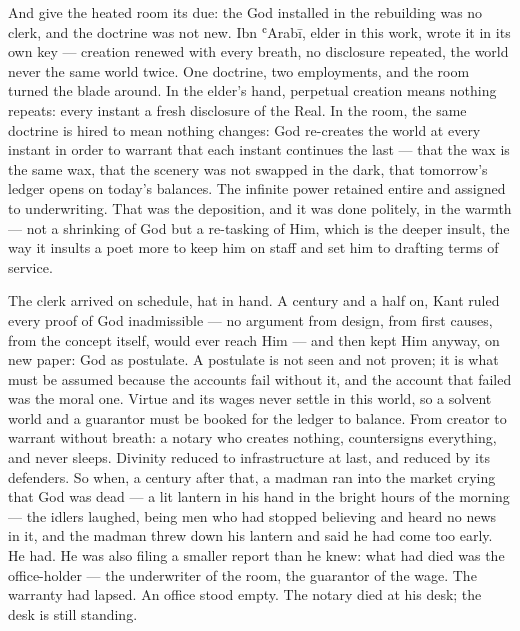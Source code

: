 And give the heated room its due: the God installed in the rebuilding
was no clerk, and the doctrine was not new. Ibn ʿArabī, elder in this
work, wrote it in its own key --- creation renewed with every breath, no
disclosure repeated, the world never the same world twice. One doctrine,
two employments, and the room turned the blade around. In the elder's
hand, perpetual creation means nothing repeats: every instant a fresh
disclosure of the Real. In the room, the same doctrine is hired to mean
nothing changes: God re-creates the world at every instant in order to
warrant that each instant continues the last --- that the wax is the
same wax, that the scenery was not swapped in the dark, that tomorrow's
ledger opens on today's balances. The infinite power retained entire and
assigned to underwriting. That was the deposition, and it was done
politely, in the warmth --- not a shrinking of God but a re-tasking of
Him, which is the deeper insult, the way it insults a poet more to keep
him on staff and set him to drafting terms of service.

The clerk arrived on schedule, hat in hand. A century and a half on,
Kant ruled every proof of God inadmissible --- no argument from design,
from first causes, from the concept itself, would ever reach Him --- and
then kept Him anyway, on new paper: God as postulate. A postulate is not
seen and not proven; it is what must be assumed because the accounts
fail without it, and the account that failed was the moral one. Virtue
and its wages never settle in this world, so a solvent world and a
guarantor must be booked for the ledger to balance. From creator to
warrant without breath: a notary who creates nothing, countersigns
everything, and never sleeps. Divinity reduced to infrastructure at
last, and reduced by its defenders. So when, a century after that, a
madman ran into the market crying that God was dead --- a lit lantern in
his hand in the bright hours of the morning --- the idlers laughed,
being men who had stopped believing and heard no news in it, and the
madman threw down his lantern and said he had come too early. He had. He
was also filing a smaller report than he knew: what had died was the
office-holder --- the underwriter of the room, the guarantor of the
wage. The warranty had lapsed. An office stood empty. The notary died at
his desk; the desk is still standing.


